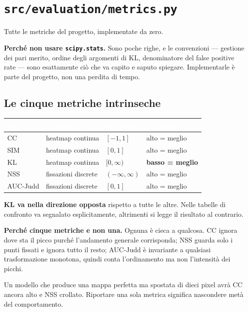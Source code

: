 \section{\texttt{src/evaluation/metrics.py}}

Tutte le metriche del progetto, implementate da zero.

\begin{nota}
\textbf{Perché non usare \texttt{scipy.stats}.} Sono poche righe, e le convenzioni --- gestione
dei pari merito, ordine degli argomenti di KL, denominatore del false positive rate --- sono
esattamente ciò che va capito e saputo spiegare. Implementarle è parte del progetto, non una
perdita di tempo.
\end{nota}

\subsection{Le cinque metriche intrinseche}

\begin{center}
\begin{tabular}{l l l l}
\toprule
\rowcolor{tblHead}\textcolor{white}{\textbf{Metrica}} & \textcolor{white}{\textbf{Ground truth}} & \textcolor{white}{\textbf{Intervallo}} & \textcolor{white}{\textbf{Direzione}} \\
\midrule
CC & heatmap continua & $[-1, 1]$ & alto = meglio \\
\rowcolor{tblAlt} SIM & heatmap continua & $[0, 1]$ & alto = meglio \\
KL & heatmap continua & $[0, \infty)$ & \textbf{basso = meglio} \\
\rowcolor{tblAlt} NSS & fissazioni discrete & $(-\infty, \infty)$ & alto = meglio \\
AUC-Judd & fissazioni discrete & $[0, 1]$ & alto = meglio \\
\bottomrule
\end{tabular}
\end{center}

\begin{attenzione}
\textbf{KL va nella direzione opposta} rispetto a tutte le altre. Nelle tabelle di confronto va
segnalato esplicitamente, altrimenti si legge il risultato al contrario.
\end{attenzione}

\begin{nota}
\textbf{Perché cinque metriche e non una.} Ognuna è cieca a qualcosa. CC ignora dove sta il picco
purché l'andamento generale corrisponda; NSS guarda solo i punti fissati e ignora tutto il resto;
AUC-Judd è invariante a qualsiasi trasformazione monotona, quindi conta l'ordinamento ma non
l'intensità dei picchi.

\medskip
Un modello che produce una mappa perfetta ma spostata di dieci pixel avrà CC ancora alto e NSS
crollato. Riportare una sola metrica significa nascondere metà del comportamento.
\end{nota}

